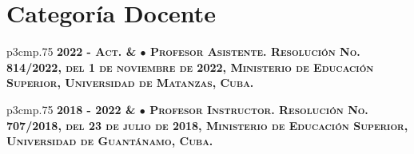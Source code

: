 
\section{{Categor\'ia Docente}}

\begin{tabular}{p{3cm}p{.75\linewidth}}
\hfill\bfseries\scshape 2022 - Act. & $\bullet$ \textbf{Profesor Asistente}. Resoluci\'on No. 814/2022, del 1 de noviembre de 2022, Ministerio de Educaci\'on Superior, Universidad de Matanzas, Cuba.
\end{tabular}

\begin{tabular}{p{3cm}p{.75\linewidth}}
\hfill\bfseries\scshape 2018 - 2022 & $\bullet$ \textbf{Profesor Instructor}. Resoluci\'on No. 707/2018, del 23 de julio de 2018, Ministerio de Educaci\'on Superior, Universidad de Guant\'anamo, Cuba.
\end{tabular}